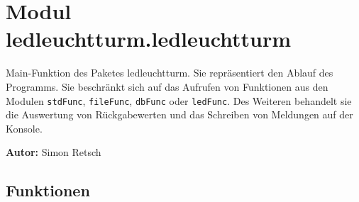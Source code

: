 %
%
%


\section{Modul ledleuchtturm.ledleuchtturm}

    \label{ledleuchtturm:ledleuchtturm}
Main-Funktion des Paketes ledleuchtturm. Sie repräsentiert den Ablauf des 
Programms. Sie beschränkt sich auf das Aufrufen von Funktionen aus den 
Modulen \texttt{stdFunc}, \texttt{fileFunc}, \texttt{dbFunc} oder 
\texttt{ledFunc}. Des Weiteren behandelt  sie die Auswertung von 
Rückgabewerten und das Schreiben von Meldungen auf der Konsole.

\textbf{Autor:} Simon Retsch





  \subsection{Funktionen}

    \label{ledleuchtturm:ledleuchtturm:signal_handler}

    \vspace{0.5ex}

